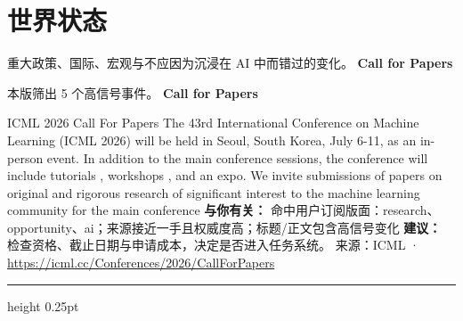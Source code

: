\documentclass[10.5pt]{ctexart}
\begin{document}
\section*{世界状态}
{\color{ormuted} 重大政策、国际、宏观与不应因为沉浸在 AI 中而错过的变化。}
\vspace{2mm}
{\LARGE\bfseries Call for Papers}\par
\vspace{1mm}
{\color{ormuted} 本版筛出 5 个高信号事件。}
\vspace{3mm}
{\Large\bfseries Call for Papers}\par
ICML 2026 Call For Papers The 43rd International Conference on Machine Learning (ICML 2026) will be held in Seoul, South Korea, July 6-11, as an in-person event. In addition to the main conference sessions, the conference will include tutorials , workshops , and an expo. We invite submissions of papers on original and rigorous research of significant interest to the machine learning community for the main conference 
\textbf{与你有关：} 命中用户订阅版面：research、opportunity、ai；来源接近一手且权威度高；标题/正文包含高信号变化
\textbf{建议：} 检查资格、截止日期与申请成本，决定是否进入任务系统。
{\footnotesize\color{ormuted} 来源：ICML · \url{https://icml.cc/Conferences/2026/CallForPapers}}
\vspace{4mm}
\hrule height 0.25pt
\vspace{3mm}
\end{document}
